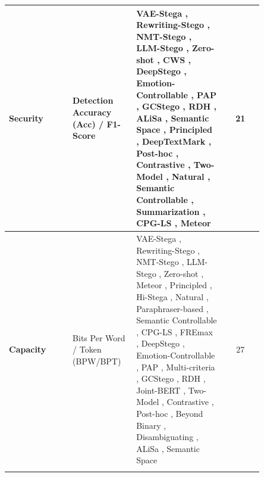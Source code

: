 \begin{table}[ht]
\begin{tabular}{|>{\raggedright\arraybackslash}p{0.25\linewidth}|>{\raggedright\arraybackslash}p{0.25\linewidth}|>{\raggedright\arraybackslash}p{0.35\linewidth}|c|}
    \textbf{Security}           & Detection Accuracy (Acc) / F1-Score & VAE-Stega \cite{yang2020vae}, Rewriting-Stego \cite{li2023rewriting}, NMT-Stego \cite{ding2023context}, LLM-Stego \cite{wu2024generative}, Zero-shot \cite{lin2024zero}, CWS \cite{li2024imperceptible}, DeepStego \cite{kuznetsov2025deepstego}, Emotion-Controllable \cite{shi2025emotionally}, PAP \cite{lin2025positionagnostic}, GCStego \cite{liao2024co}, RDH \cite{zheng2022general}, ALiSa \cite{yi2022alisa}, Semantic Space \cite{zhang2020linguistic}, Principled \cite{ji2024principled}, DeepTextMark \cite{munyer2024deeptextmark}, Post-hoc \cite{hao2025robust}, Contrastive \cite{wang2025contrastive}, Two-Model \cite{chen2025activetwo}, Natural \cite{steinebach2024natural}, Semantic Controllable \cite{li2024semantic}, Summarization \cite{zhang2024controllable}, CPG-LS \cite{xiang2023cpg}, Meteor \cite{kaptchuk2021meteor}                                                                                                                                        & 21                   \\
    \hline
    \textbf{Capacity}           & Bits Per Word / Token (BPW/BPT)     & VAE-Stega \cite{yang2020vae}, Rewriting-Stego \cite{li2023rewriting}, NMT-Stego \cite{ding2023context}, LLM-Stego \cite{wu2024generative}, Zero-shot \cite{lin2024zero}, Meteor \cite{kaptchuk2021meteor}, Principled \cite{ji2024principled}, Hi-Stega \cite{wang2023hi}, Natural \cite{steinebach2024natural}, Paraphraser-based \cite{qiang2023natural}, Semantic Controllable \cite{li2024semantic}, CPG-LS \cite{xiang2023cpg}, FREmax \cite{pang2024fremax}, DeepStego \cite{kuznetsov2025deepstego}, Emotion-Controllable \cite{shi2025emotionally}, PAP \cite{lin2025positionagnostic}, Multi-criteria \cite{wozniak2025multicriteria}, GCStego \cite{liao2024co}, RDH \cite{zheng2022general}, Joint-BERT \cite{ding2023joint}, Two-Model \cite{chen2025activetwo}, Contrastive \cite{wang2025contrastive}, Post-hoc \cite{hao2025robust}, Beyond Binary \cite{xu2024beyond}, Disambiguating \cite{qi2024provably}, ALiSa \cite{yi2022alisa}, Semantic Space \cite{zhang2020linguistic} & 27                   \\
    \cline{2-4}

\end{tabular}
\end{table}
